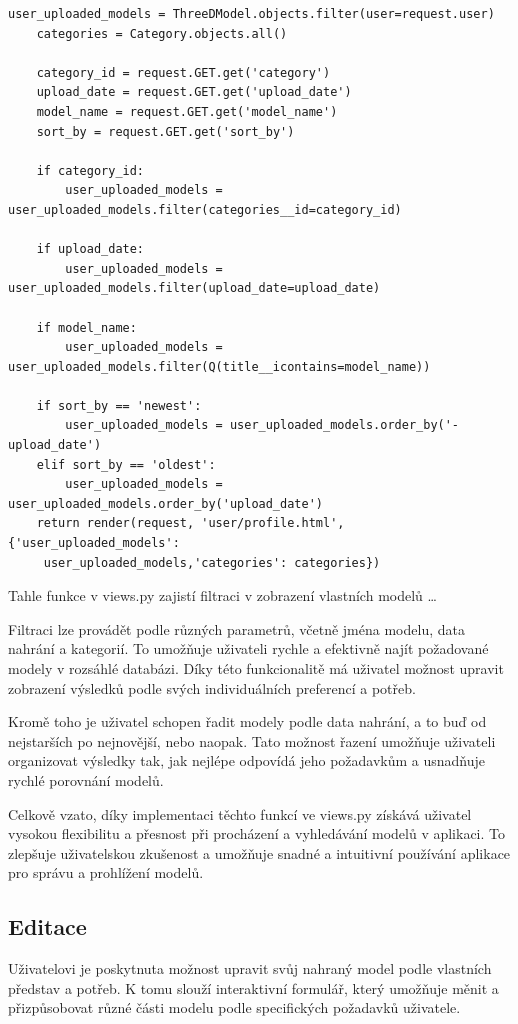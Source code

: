 \documentclass[12pt, a4paper,
oneside,      %
openright
]{report}
\begin{document}
\begin{lstlisting}
user_uploaded_models = ThreeDModel.objects.filter(user=request.user)
    categories = Category.objects.all()
    
    category_id = request.GET.get('category')
    upload_date = request.GET.get('upload_date')
    model_name = request.GET.get('model_name')
    sort_by = request.GET.get('sort_by')
   
    if category_id:
        user_uploaded_models = user_uploaded_models.filter(categories__id=category_id)
    
    if upload_date:
        user_uploaded_models = user_uploaded_models.filter(upload_date=upload_date)
   
    if model_name:
        user_uploaded_models = user_uploaded_models.filter(Q(title__icontains=model_name))
   
    if sort_by == 'newest':
        user_uploaded_models = user_uploaded_models.order_by('-upload_date')
    elif sort_by == 'oldest':
        user_uploaded_models = user_uploaded_models.order_by('upload_date')
    return render(request, 'user/profile.html', {'user_uploaded_models':
     user_uploaded_models,'categories': categories})
\end{lstlisting}
Tahle funkce v views.py zajistí filtraci v zobrazení vlastních modelů \dots



Filtraci lze provádět podle různých parametrů, včetně jména modelu, data nahrání a kategorií. To umožňuje uživateli rychle a efektivně najít požadované modely v rozsáhlé databázi. Díky této funkcionalitě má uživatel možnost upravit zobrazení výsledků podle svých individuálních preferencí a potřeb.

Kromě toho je uživatel schopen řadit modely podle data nahrání, a to buď od nejstarších po nejnovější, nebo naopak. Tato možnost řazení umožňuje uživateli organizovat výsledky tak, jak nejlépe odpovídá jeho požadavkům a usnadňuje rychlé porovnání modelů.

Celkově vzato, díky implementaci těchto funkcí ve views.py získává uživatel vysokou flexibilitu a přesnost při procházení a vyhledávání modelů v aplikaci. To zlepšuje uživatelskou zkušenost a umožňuje snadné a intuitivní používání aplikace pro správu a prohlížení modelů.
		
		\subsection[Editace]{Editace}
		Uživatelovi je poskytnuta možnost upravit svůj nahraný model podle vlastních představ a potřeb. K tomu slouží interaktivní formulář, který umožňuje měnit a přizpůsobovat různé části modelu podle specifických požadavků uživatele.
\end{document}
